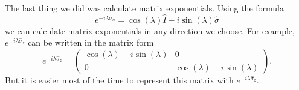 \documentclass[twocolumn]{article}
\begin{document}
The last thing we did was calculate matrix exponentials. Using the formula
\begin{equation}\label{eq:23}
e^{-i\lambda\hat{\sigma}_n}=\cos{(\lambda)}\hat{I}-i\sin{(\lambda)}\hat{\sigma}
\end{equation}
we can calculate matrix exponentials in any direction we choose. For example, $e^{-i\lambda\hat{\sigma}_z}$ can be written in the matrix form
\begin{equation}\label{eq:24}
e^{-i\lambda\hat{\sigma}_z}=
\begin{pmatrix}
\cos{(\lambda)}-i\sin{(\lambda)} & 0 \\
0 & \cos{(\lambda)}+i\sin{(\lambda)}
\end{pmatrix}.
\end{equation}
But it is easier most of the time to represent this matrix with $e^{-i\lambda\hat{\sigma}_z}$.
\end{document}

